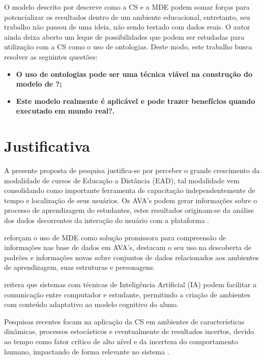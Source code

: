 \documentclass[
	oneside,
	12pt,				%
	a4paper,			%
	english,			%
	brazil,				%
	article
	]{abntex2}
\begin{document}
O modelo descrito por  descreve como a CS e a MDE podem somar forças para potencializar os resultados dentro de um ambiente educacional, entretanto, seu trabalho não passou de uma ideia, não sendo testado com dados reais. O autor ainda deixa aberto um leque de possibilidades que podem ser estudadas para utilização com a CS como o uso de ontologias. Deste modo, este trabalho busca resolver as seguintes questões:

\begin{itemize}	
	\item \textbf{O uso de ontologias pode ser uma técnica viável na construção do modelo de ?;}
	\item \textbf{Este modelo realmente é aplicável e pode trazer benefícios quando executado em mundo real?.}	 
\end{itemize}

\section{Justificativa}

A presente proposta de pesquisa justifica-se por perceber o grande crescimento da modalidade de cursos de Educação a Distância (EAD), tal modalidade vem consolidando como importante ferramenta de capacitação independentemente de tempo e localização de seus usuários. Os AVA's podem gerar informações sobre o processo de aprendizagem do estudantes, estes resultados originam-se da análise dos dados decorrentes da interação do usuário com a plataforma \cite{Fernandes2017}.

 reforçam o uso de MDE como solução promissora para compreensão de informações nas base de dados em AVA’s, \cite{Rabelo_et_al2017} destacam o seu uso na descoberta de padrões e informações novas sobre conjuntos de dados relacionados aos ambientes de aprendizagem, suas estruturas e personagens.

 reitera que sistemas com técnicas de Inteligência Artificial (IA) podem facilitar a comunicação entre computador e estudante, permitindo a criação de ambientes com conteúdo adaptativo ao modelo cognitivo do aluno. 

Pesquisas recentes focam na aplicação da CS em ambientes de características dinâmicas, processos estocásticos e eventualmente de resultados incertos, devido ao tempo como fator crítico de alto nível e da incerteza do comportamento humano, impactando de forma relevante no sistema  \cite{Berti2017}.
\end{document}
